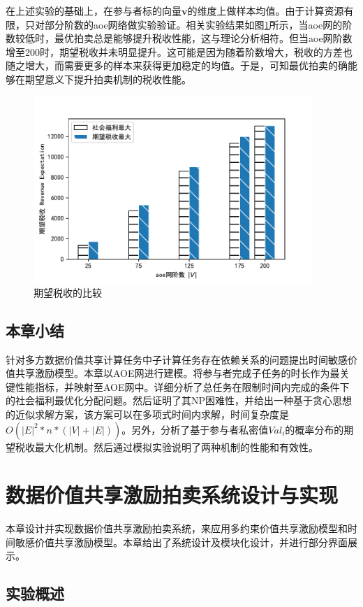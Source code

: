 \documentclass[promaster]{thesis-uestc}
\begin{document}
在上述实验的基础上，在参与者标的向量$\mathbf{v}$的维度上做样本均值。由于计算资源有限，只对部分阶数的aoe网络做实验验证。相关实验结果如图\ref{picc2}所示，当aoe网的阶数较低时，最优拍卖总是能够提升税收性能，这与理论分析相符。但当aoe网阶数增至200时，期望税收并未明显提升。这可能是因为随着阶数增大，税收的方差也随之增大，而需要更多的样本来获得更加稳定的均值。于是，可知最优拍卖的确能够在期望意义下提升拍卖机制的税收性能。

\begin{figure}[H]
    \includegraphics[width=300pt]{exp/expswandoptimal.pdf}
    \caption{期望税收的比较}
    \label{picc2}
\end{figure}

\FloatBarrier

\section{本章小结}

针对多方数据价值共享计算任务中子计算任务存在依赖关系的问题提出时间敏感价值共享激励模型。本章以AOE网进行建模。将参与者完成子任务的时长作为最关键性能指标，并映射至AOE网中。详细分析了总任务在限制时间内完成的条件下的社会福利最优化分配问题。然后证明了其NP困难性，并给出一种基于贪心思想的近似求解方案，该方案可以在多项式时间内求解，时间复杂度是$O(|E|^2*n*(|V|+|E|))$。另外，分析了基于参与者私密值$Val_i$的概率分布的期望税收最大化机制。然后通过模拟实验说明了两种机制的性能和有效性。


\chapter{数据价值共享激励拍卖系统设计与实现}
本章设计并实现数据价值共享激励拍卖系统，来应用多约束价值共享激励模型和时间敏感价值共享激励模型。本章给出了系统设计及模块化设计，并进行部分界面展示。
\section{实验概述}
\end{document}
